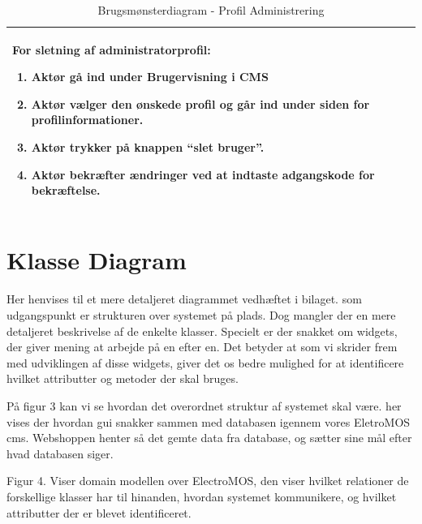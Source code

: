 \begin{table}[t]
\begin{tabular}{|p{3cm}|p{14cm}|}
\begin{minipage}{14cm}
\begin{enumerate}
        	\end{enumerate}
            For sletning af administratorprofil:
            \begin{enumerate}
            \item Aktør gå ind under Brugervisning i CMS
            \item Aktør vælger den ønskede profil og går ind under siden for profilinformationer.
            \item Aktør trykker på knappen “slet bruger”.
            \item Aktør bekræfter ændringer ved at indtaste adgangskode for bekræftelse.
            \end{enumerate}
        \end{minipage} \\ 
        \hline
    \end{tabular}
    \caption{Brugsmønsterdiagram - Profil Administrering}
    \label{UC-ProfilAdministrering}
\end{table}

\FloatBarrier

\section{Klasse Diagram}
Her henvises til et mere detaljeret diagrammet vedhæftet i bilaget. som udgangspunkt er strukturen over systemet på plads. Dog mangler der en mere detaljeret beskrivelse af de enkelte klasser. Specielt er der snakket om widgets, der giver mening at arbejde på en efter en. Det betyder at som vi skrider frem med udviklingen af disse widgets, giver det os bedre mulighed for at identificere hvilket attributter og metoder der skal bruges.
 
På figur 3 kan vi se hvordan det overordnet struktur af systemet skal være. her vises der hvordan gui snakker sammen med databasen igennem vores EletroMOS cms. Webshoppen henter så det gemte data fra database, og sætter sine mål efter hvad databasen siger.
 
Figur 4. Viser domain modellen over ElectroMOS, den viser hvilket relationer de forskellige klasser har til hinanden, hvordan systemet kommunikere, og hvilket attributter der er blevet identificeret.

